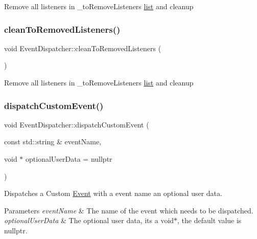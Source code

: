 Remove all listeners in \+\_\+to\+Remove\+Listeners \hyperlink{protocollist-p}{list} and cleanup \mbox{\label{classEventDispatcher_ac4610bd51dadf12ab82b1793e26340c6}} 
\subsubsection{\texorpdfstring{clean\+To\+Removed\+Listeners()}{cleanToRemovedListeners()}\hspace{0.1cm}{\footnotesize\ttfamily [2/2]}}
{\footnotesize\ttfamily void Event\+Dispatcher\+::clean\+To\+Removed\+Listeners (\begin{DoxyParamCaption}{ }\end{DoxyParamCaption})\hspace{0.3cm}{\ttfamily [protected]}}

Remove all listeners in \+\_\+to\+Remove\+Listeners \hyperlink{protocollist-p}{list} and cleanup \mbox{\label{classEventDispatcher_aca6dac5b1a5363409c51331bc3142bea}} 
\subsubsection{\texorpdfstring{dispatch\+Custom\+Event()}{dispatchCustomEvent()}\hspace{0.1cm}{\footnotesize\ttfamily [1/2]}}
{\footnotesize\ttfamily void Event\+Dispatcher\+::dispatch\+Custom\+Event (\begin{DoxyParamCaption}\item[{const std\+::string \&}]{event\+Name,  }\item[{void $\ast$}]{optional\+User\+Data = {\ttfamily nullptr} }\end{DoxyParamCaption})}

Dispatches a Custom \hyperlink{classEvent}{Event} with a event name an optional user data.


\begin{DoxyParams}{Parameters}
{\em event\+Name} & The name of the event which needs to be dispatched. \\
\hline
{\em optional\+User\+Data} & The optional user data, it\textquotesingle{}s a void$\ast$, the default value is nullptr. \\
\hline
\end{DoxyParams}
\mbox{\label{classEventDispatcher_aca6dac5b1a5363409c51331bc3142bea}} 
